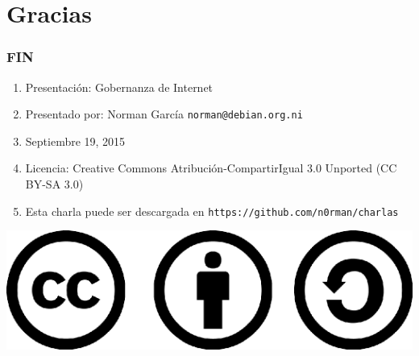 \documentclass{beamer}
\begin{document}
\section{Gracias}
\begin{frame}
\frametitle{FIN}
	\begin{enumerate}
		\item Presentaci\'on: Gobernanza de Internet
		\item Presentado por: Norman Garc\'ia  \texttt{norman@debian.org.ni}
		\item Septiembre 19, 2015
		\item Licencia: Creative Commons Atribuci\'on-CompartirIgual 3.0 Unported (CC BY-SA 3.0)
		\item Esta charla puede ser descargada en \texttt{https://github.com/n0rman/charlas}
	\end{enumerate}

	\begin{center}
  		 \includegraphics[scale=0.20]{../img/cclogo.png}
	\end{center}

\end{frame}
\end{document}
